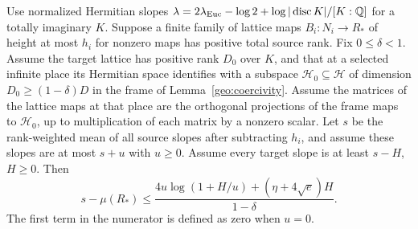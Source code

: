 \begin{theorem}\label{geo:hn}
Use normalized Hermitian slopes \(\lambda=2\lambda_{\rm Euc}-\log 2+\log|\operatorname{disc}K|/[K:\mathbb Q]\) for a totally imaginary \(K\). Suppose a finite family of lattice maps \(B_i:N_i\to R_*\) of height at most \(h_i\) for nonzero maps has positive total source rank. Fix \(0\le\delta<1\). Assume the target lattice has positive rank \(D_0\) over \(K\), and that at a selected infinite place its Hermitian space identifies with a subspace \(\mathcal H_0\subseteq\mathcal H\) of dimension \(D_0\ge(1-\delta)D\) in the frame of Lemma~\ref{geo:coercivity}. Assume the matrices of the lattice maps at that place are the orthogonal projections of the frame maps to \(\mathcal H_0\), up to multiplication of each matrix by a nonzero scalar. Let \(s\) be the rank-weighted mean of all source slopes after subtracting \(h_i\), and assume these slopes are at most \(s+u\) with \(u\ge0\). Assume every target slope is at least \(s-H\), \(H\ge0\). Then
\begin{equation}\label{geo:hn-result}
 s-\mu(R_*)\le
 \frac{4u\log(1+H/u)+(\eta+4\sqrt e)H}{1-\delta}.
\end{equation}
The first term in the numerator is defined as zero when \(u=0\).
\end{theorem}
